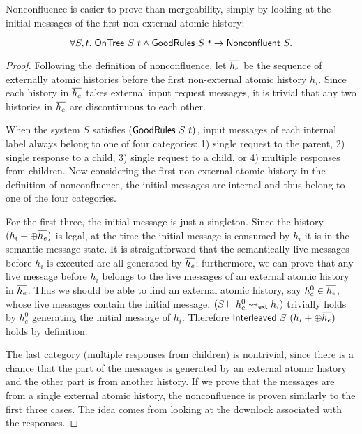 \documentclass[sigplan,10pt,review,anonymous,screen]{acmart}\settopmatter{printfolios=true,printccs=false,printacmref=false}
\begin{document}
Nonconfluence is easier to prove than mergeability, simply by looking at the initial messages of the first non-external atomic history:
\renewcommand*{\proofname}{Proof Sketch}
\begin{theorem}
  \begin{displaymath}
    \forall S, t.\; \mathsf{OnTree}\ S\ t \land \mathsf{GoodRules}\ S\ t \to \mathsf{Nonconfluent}\ S.
  \end{displaymath}
\end{theorem}
\begin{proof}
  Following the definition of nonconfluence, let $\overline{h_e}$ be the sequence of externally atomic histories before the first non-external atomic history $h_i$.
  Since each history in $\overline{h_e}$ takes external input request messages, it is trivial that any two histories in $\overline{h_e}$ are discontinuous to each other.

  When the system $S$ satisfies $(\mathsf{GoodRules}\ S\ t)$, input messages of each internal label always belong to one of four categories:
  1) single request to the parent, 2) single response to a child, 3) single request to a child, or 4) multiple responses from children.
  Now considering the first non-external atomic history in the definition of nonconfluence, the initial messages are internal and thus belong to one of the four categories.

  For the first three, the initial message is just a singleton.
  Since the history $(h_i + \oplus \overline{h_e})$ is legal, at the time the initial message is consumed by $h_i$ it is in the semantic message state.
  It is straightforward that the semantically live messages before $h_i$ is executed are all generated by $\overline{h_e}$; furthermore, we can prove that any live message before $h_i$ belongs to the live messages of an external atomic history in $\overline{h_e}$.
  Thus we should be able to find an external atomic history, say $h^0_e \in \overline{h_e}$, whose live messages contain the initial message.
  $(S \vdash h^0_e \leadsto_{\textsf{ext}} h_i)$ trivially holds by $h^0_e$ generating the initial message of $h_i$.
  Therefore $\mathsf{Interleaved}\ S\ (h_i + \oplus \overline{h_e})$ holds by definition.

  The last category (multiple responses from children) is nontrivial, since there is a chance that the part of the messages is generated by an external atomic history and the other part is from another history.
  If we prove that the messages are from a single external atomic history, the nonconfluence is proven similarly to the first three cases.
  The idea comes from looking at the downlock associated with the responses.


\end{proof}
\end{document}
